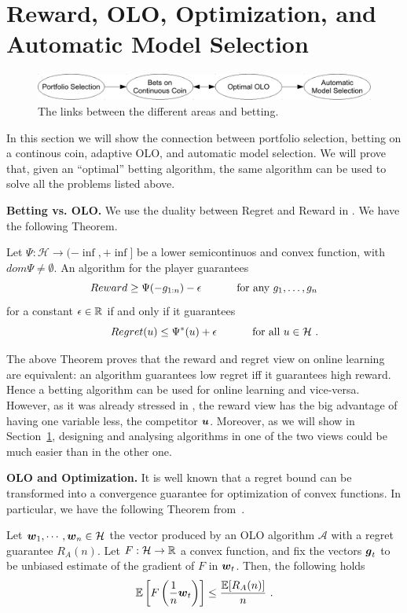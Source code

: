 \section{Reward, OLO, Optimization, and Automatic Model Selection}

\begin{figure}[t]
\centering
\includegraphics[width=.95\linewidth]{./figs/links_between_areas.pdf}
\caption{The links between the different areas and betting.}
\end{figure}

In this section we will show the connection between portfolio selection, betting on a continous coin, adaptive OLO, and automatic model selection. We will prove that, given an ``optimal'' betting algorithm, the same algorithm can be used to solve all the problems listed above.

\textbf{Betting vs. OLO.}
We use the duality between Regret and Reward in \citet{McMahanO14}.
We have the following Theorem.
\begin{theorem}
  \label{thm:rrdual}
  Let $\Psi:\mathcal{H} \rightarrow (-\inf, +\inf]$ be a lower semicontinuos and convex function, with $dom \Psi \neq \emptyset$. An
  algorithm for the player guarantees
  \[
  Reward \geq \Psi(-g_{1:n}) - \epsilon \quad \quad \quad \textnormal{ for any } g_1, \dots, g_n
  \]
  for a constant $\epsilon \in \mathbb{R}$ if and only if it
  guarantees
  \begin{equation}\label{eq:regb}
  \qquad Regret(u) \leq \Psi^*(u) + \epsilon \quad \quad \quad \textnormal{ for all } u \in \mathcal{H}~.
  \end{equation}
\end{theorem}

The above Theorem proves that the reward and regret view on online learning are equivalent: an algorithm guarantees low regret iff it guarantees high reward. Hence a betting algorithm can be used for online learning and vice-versa. However, as it was already stressed in \citet{McMahanO14}, the reward view has the big advantage of having one variable less, the competitor $\boldsymbol{u}$.
Moreover, as we will show in Section~\ref{}, designing and analysing algorithms in one of the two views could be much easier than in the other one.

\textbf{OLO and Optimization.}
It is well known that a regret bound can be transformed into a convergence guarantee for optimization of convex functions.
In particular, we have the following Theorem from~\citet{Cesa-BianchiCG04}.
%
\begin{theorem}
Let $\boldsymbol{w}_1, \cdots, \boldsymbol{w}_n \in \mathcal{H}$ the vector produced by an OLO algorithm $\mathcal{A}$ with a regret guarantee $R_A(n)$.
Let $F:\mathcal{H}\rightarrow\mathbb{R}$ a convex function, and fix the vectors $\boldsymbol{g}_t$ to be unbiased estimate of the gradient of $F$ in $\boldsymbol{w}_t$. Then, the following holds
\[
\mathbb{E}\left[F\left(\frac{1}{n} \boldsymbol{w}_t\right)\right] \leq \frac{\mathbb{E}[R_A(n)]}{n}~.
\]
\end{theorem}

